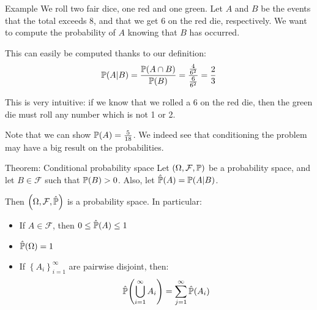 \documentclass[a4paper]{article}
\begin{document}
\begin{parag}{Example}
    We roll two fair dice, one red and one green. Let $A$ and $B$ be the events that the total exceeds 8, and that we get 6 on the red die, respectively. We want to compute the probability of $A$ knowing that $B$ has occurred.

    This can easily be computed thanks to our definition: 
    \[\prob\left(A | B\right) = \frac{\prob\left(A \cap B\right)}{\prob\left(B\right)} = \frac{\frac{4}{6^2}}{\frac{6}{6^2}} = \frac{2}{3}\]

    This is very intuitive: if we know that we rolled a 6 on the red die, then the green die must roll any number which is not 1 or 2.

    Note that we can show $\prob\left(A\right) = \frac{5}{18}$. We indeed see that conditioning the problem may have a big result on the probabilities.
\end{parag}

\begin{parag}{Theorem: Conditional probability space}
    Let $\left(\Omega, \mathcal{F}, \prob\right)$ be a probability space, and let $B \in \mathcal{F}$ such that $\prob\left(B\right) > 0$. Also, let $\hat{\prob}\left(A\right) = \prob\left(A | B\right)$.

    Then $\left(\Omega, \mathcal{F}, \hat{\prob}\right)$ is a probability space. In particular:
    \begin{itemize}
        \item If $A \in \mathcal{F}$, then $0 \leq \hat{\prob}\left(A\right) \leq 1$
        \item $\hat{\prob}\left(\Omega\right) = 1$
        \item If $\left\{A_i\right\}_{i=1}^{\infty}$ are pairwise disjoint, then: 
        \[\hat{\prob}\left(\bigcup_{i=1}^{\infty} A_i\right) = \sum_{j=1}^{\infty} \hat{\prob}\left(A_i\right)\]
    \end{itemize}
\end{parag}
\end{document}
